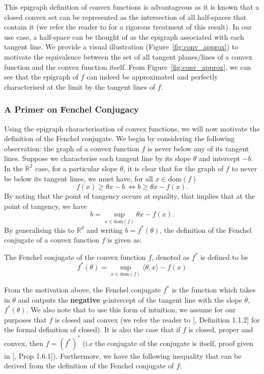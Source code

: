 \noindent This epigraph definition of convex functions is advantageous as it is known that a closed convex set can be represented as the intersection of all half-spaces that contain it (we refer the reader to \cite[Prop.~1.5.4]{bertsekas2009convex} for a rigorous treatment of this result). In our use case, a half-space can be thought of as the epigraph associated with each tangent line.
We provide a visual illustration (Figure~\ref{fig:conv_approx}) to motivate the equivalence between the set of all tangent planes/lines of a convex function and the convex function itself. From Figure~\ref{fig:conv_approx}, we can see that the epigraph of $f$ can indeed be approximated and perfectly characterised at the limit by the tangent lines of $f$.

\subsubsection{A Primer on Fenchel Conjugacy}
Using the epigraph characterisation of convex functions, we will now motivate the definition of the Fenchel conjugate. We begin by considering the following observation: the graph of a convex function $f$ is never below any of its tangent lines. Suppose we characterise each tangent line by its slope $\theta$ and intercept $-b$. In the $\mathbb{R}^2$ case, for a particular slope $\theta$, it is clear that for the graph of $f$ to never be below its tangent lines, we must have, for all $x \in \text{dom}(f)$
$$
f(x) \geq \theta x - b \ \Leftrightarrow b \geq \theta x - f(x).
$$
By noting that the point of tangency occurs at equality, that implies that at the point of tangency, we have
$$ b = \sup_{x \in \text{dom}(f)} \theta x - f(x). $$
By generalising this to $\mathbb{R}^d$ and writing $b = f^*(\theta)$, the definition of the Fenchel conjugate of a convex function $f$ is given as:
\begin{define}
    The Fenchel conjugate of the convex function $f$, denoted as $f^*$ is defined to be\begin{equation}\label{eqn:frenchel_conjugate}
        f^*(\theta) = \sup_{x \in \text{dom}(f)} \langle \theta, x \rangle -f(x)
    \end{equation}
\end{define}
\noindent From the motivation above, the Fenchel conjugate $f^*$ is the function which takes in $\theta$ and outputs the \textbf{negative} $y$-intercept of the tangent line with the slope $\theta$, $f^*(\theta)$. We also note that to use this form of intuition, we assume for our purposes that $f$ is closed and convex (we refer the reader to [\cite{bertsekas2009convex}, Definition 1.1.2] for the formal definition of closed). It is also the case that if $f$ is closed, proper and convex, then $f = (f^*)^*$ (i.e the conjugate of the conjugate is itself, proof given in [\cite{bertsekas2009convex}, Prop 1.6.1]). Furthermore, we have the following inequality that can be derived from the definition of the Fenchel conjugate of $f$:
